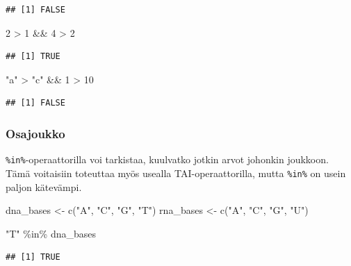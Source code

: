 \documentclass[
]{book}
\newenvironment{Shaded}{\begin{snugshade}}{\end{snugshade}}
\newcommand{\DecValTok}[1]{\textcolor[rgb]{0.00,0.00,0.81}{#1}}
\newcommand{\FunctionTok}[1]{\textcolor[rgb]{0.00,0.00,0.00}{#1}}
\newcommand{\NormalTok}[1]{#1}
\newcommand{\OtherTok}[1]{\textcolor[rgb]{0.56,0.35,0.01}{#1}}
\newcommand{\SpecialCharTok}[1]{\textcolor[rgb]{0.00,0.00,0.00}{#1}}
\newcommand{\StringTok}[1]{\textcolor[rgb]{0.31,0.60,0.02}{#1}}
\begin{document}
\begin{verbatim}
## [1] FALSE
\end{verbatim}

\begin{Shaded}
\begin{Highlighting}[]
\DecValTok{2} \SpecialCharTok{\textgreater{}} \DecValTok{1} \SpecialCharTok{\&\&} \DecValTok{4} \SpecialCharTok{\textgreater{}} \DecValTok{2}
\end{Highlighting}
\end{Shaded}

\begin{verbatim}
## [1] TRUE
\end{verbatim}

\begin{Shaded}
\begin{Highlighting}[]
\StringTok{"a"} \SpecialCharTok{\textgreater{}} \StringTok{"c"} \SpecialCharTok{\&\&} \DecValTok{1} \SpecialCharTok{\textgreater{}} \DecValTok{10}
\end{Highlighting}
\end{Shaded}

\begin{verbatim}
## [1] FALSE
\end{verbatim}

\hypertarget{osajoukko}{%
\subsubsection{Osajoukko}\label{osajoukko}}

\texttt{\%in\%}-operaattorilla voi tarkistaa, kuulvatko jotkin arvot johonkin joukkoon. Tämä voitaisiin toteuttaa myös usealla TAI-operaattorilla, mutta \texttt{\%in\%} on usein paljon kätevämpi.

\begin{Shaded}
\begin{Highlighting}[]
\NormalTok{dna\_bases }\OtherTok{\textless{}{-}} \FunctionTok{c}\NormalTok{(}\StringTok{"A"}\NormalTok{, }\StringTok{"C"}\NormalTok{, }\StringTok{"G"}\NormalTok{, }\StringTok{"T"}\NormalTok{)}
\NormalTok{rna\_bases }\OtherTok{\textless{}{-}} \FunctionTok{c}\NormalTok{(}\StringTok{"A"}\NormalTok{, }\StringTok{"C"}\NormalTok{, }\StringTok{"G"}\NormalTok{, }\StringTok{"U"}\NormalTok{)}

\StringTok{"T"} \SpecialCharTok{\%in\%}\NormalTok{ dna\_bases}
\end{Highlighting}
\end{Shaded}

\begin{verbatim}
## [1] TRUE
\end{verbatim}
\end{document}
